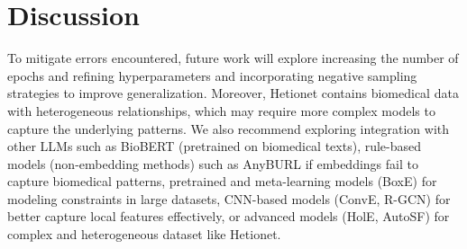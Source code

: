 \section*{Discussion}



To mitigate errors encountered, future work will explore increasing the number of epochs and refining hyperparameters and incorporating negative sampling strategies to improve generalization. Moreover, Hetionet contains biomedical data with heterogeneous relationships, which may require more complex models to capture the underlying patterns. We also recommend exploring integration with other LLMs such as BioBERT (pretrained on biomedical texts), rule-based models (non-embedding methods) such as AnyBURL if embeddings fail to capture biomedical patterns, pretrained and meta-learning models (BoxE) for modeling constraints in large datasets, CNN-based models (ConvE, R-GCN) for better capture local features effectively, or advanced models (HolE, AutoSF) for complex and heterogeneous dataset like Hetionet.